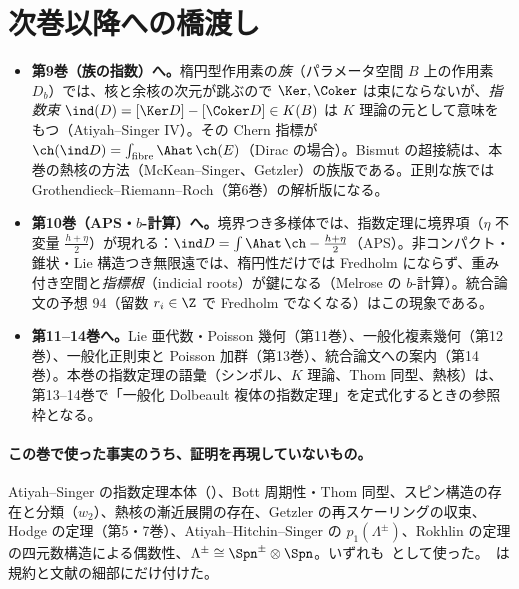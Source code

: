 \section{次巻以降への橋渡し}\label{sec:bridge}
\begin{itemize}
\item \textbf{第9巻（族の指数）へ。}楕円型作用素の\emph{族}（パラメータ空間 $B$ 上の作用素 $D_b$）では、核と余核の次元が跳ぶので $\Ker,\Coker$ は束にならないが、\emph{指数束} $\ind(D)=[\Ker D]-[\Coker D]\in K(B)$ は $K$ 理論の元として意味をもつ（Atiyah--Singer IV）。その Chern 指標が $\ch(\ind D)=\int_{\rm fibre}\Ahat\,\ch(E)$（Dirac の場合）。Bismut の超接続は、本巻の熱核の方法（McKean--Singer、Getzler）の族版である。正則な族では Grothendieck--Riemann--Roch（第6巻）の解析版になる。
\item \textbf{第10巻（APS・$b$-計算）へ。}境界つき多様体では、指数定理に境界項（$\eta$ 不変量 $\frac{h+\eta}2$）が現れる：$\ind D=\int\Ahat\,\ch-\frac{h+\eta}2$（APS）。非コンパクト・錐状・Lie 構造つき無限遠では、楕円性だけでは Fredholm にならず、重み付き空間と\emph{指標根}（indicial roots）が鍵になる（Melrose の $b$-計算）。統合論文の予想 94（留数 $r_i\in\Z$ で Fredholm でなくなる）はこの現象である。
\item \textbf{第11--14巻へ。}Lie 亜代数・Poisson 幾何（第11巻）、一般化複素幾何（第12巻）、一般化正則束と Poisson 加群（第13巻）、統合論文への案内（第14巻）。本巻の指数定理の語彙（シンボル、$K$ 理論、Thom 同型、熱核）は、第13--14巻で「一般化 Dolbeault 複体の指数定理」を定式化するときの参照枠となる。
\end{itemize}
\paragraph{この巻で使った事実のうち、証明を再現していないもの。}Atiyah--Singer の指数定理本体（\tC ）、Bott 周期性・Thom 同型、スピン構造の存在と分類（$w_2$）、熱核の漸近展開の存在、Getzler の再スケーリングの収束、Hodge の定理（第5・7巻）、Atiyah--Hitchin--Singer の $p_1(\Lambda^\pm)$、Rokhlin の定理の四元数構造による偶数性、$\Lambda^\pm\cong\Spn^\pm\otimes\Spn$。いずれも\tC\ として使った。\tQ\ は規約と文献の細部にだけ付けた。

